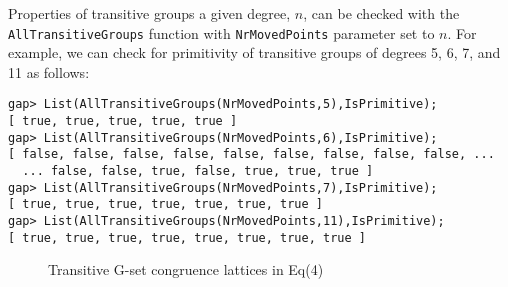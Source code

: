 Properties of transitive groups a given degree, $n$, can be checked with
the {\tt AllTransitiveGroups} function with {\tt NrMovedPoints} parameter set to
$n$.  For example, we can check for primitivity of transitive groups of degrees
5, 6, 7, and 11 as follows:
{\small
\begin{verbatim}
gap> List(AllTransitiveGroups(NrMovedPoints,5),IsPrimitive);
[ true, true, true, true, true ]
gap> List(AllTransitiveGroups(NrMovedPoints,6),IsPrimitive);
[ false, false, false, false, false, false, false, false, false, ...
  ... false, false, true, false, true, true, true ]
gap> List(AllTransitiveGroups(NrMovedPoints,7),IsPrimitive);
[ true, true, true, true, true, true, true ]
gap> List(AllTransitiveGroups(NrMovedPoints,11),IsPrimitive);
[ true, true, true, true, true, true, true, true ]
\end{verbatim}}

\begin{figure}[h]
\caption{Transitive G-set congruence lattices in Eq(4)}
\label{fig:4}
\begin{center}
\end{center}
\end{figure}



